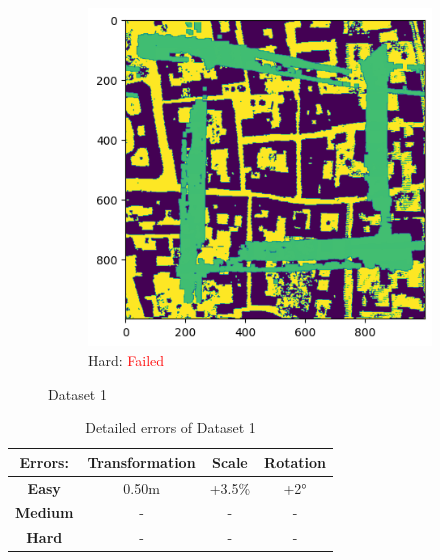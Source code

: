 \documentclass[11pt]{article}
\begin{document}
\begin{figure}[p]
        \vspace{1em}

        \begin{subfigure}{0.45\textwidth}
            \centering
            \includegraphics[width=\linewidth]{images/full/hard/4_3_3_hard}
            \caption{Hard: \textcolor{red}{Failed}}
            \label{fig:4_3_3_hard}
        \end{subfigure}
        \hfill

        \caption{Dataset 1}
        \label{fig:res_4_3_3}
    \end{figure}

    \begin{table}[p]
        \centering
        \begin{tabular}{|c|c|c|c|}
          \hline
          \textbf{Errors:} & \textbf{Transformation} & \textbf{Scale} & \textbf{Rotation} \\
          \hline
          \textbf{Easy} & 0.50m & +3.5\% & +2° \\
          \hline
          \textbf{Medium} & - & - & - \\
          \hline
          \textbf{Hard} & - & - & - \\
          \hline
        \end{tabular}
        \caption{Detailed errors of Dataset 1}
        \label{tab:tab_1}
    \end{table}
\end{document}
